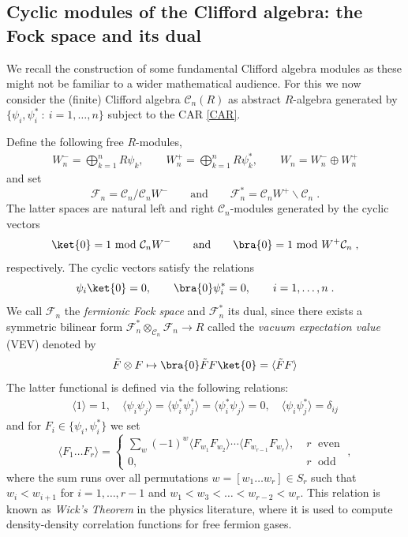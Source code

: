 \documentclass[12pt]{amsart}
\newcommand{\mc}[1]{\mathcal{#1}}
\newcommand{\ring}{R}
\numberwithin{equation}{section}
\numberwithin{figure}{section}
\begin{document}
\subsection{Cyclic modules of the Clifford algebra: the Fock space and its dual}
We recall the construction of some fundamental Clifford algebra modules as these might not be familiar to a wider mathematical audience. For this we now consider the (finite) Clifford algebra $\mc{C}_n(\ring)$ as abstract $\ring$-algebra generated by $\{\psi_i,\psi_i^*~:~i=1,\ldots,n\}$ subject to the CAR \eqref{CAR}.

Define the following free $\ring$-modules,
\begin{gather}
W_n^-=\bigoplus_{k=1}^n\ring \psi_k,\qquad W_n^+=\bigoplus^n_{k=1}\ring\psi^*_k,\qquad
 W_n=W_n^-\oplus W_n^+
\end{gather}
and set
\begin{equation}
    \mc{F}_n=\mc{C}_n/\mc{C}_n W^-\qquad\text{and}\qquad
    \mc{F}^*_n=\mc{C}_nW^+\backslash\mc{C}_n\;.
\end{equation}
The latter spaces are natural left and right $\mc{C}_n$-modules generated by the cyclic vectors
\begin{equation}
\ket{0}=1\!\!\mod \mc{C}_n W^-
\qquad\text{and}\qquad
\bra{0}=1\!\!\mod W^+\mc{C}_n\;,
\end{equation}
respectively. The cyclic vectors satisfy the relations
\[
\psi_i\ket{0}=0,\qquad\bra{0}\psi_i^*=0,\qquad i=1,\ldots,n\;.
\]
We call $\mc{F}_n$ the {\em fermionic Fock space} and $\mc{F}^*_n$ its dual, since there exists a symmetric bilinear form $\mc{F}^*_n\otimes_{\mc{C}_n}\mc{F}_n\to\ring$ called the {\em vacuum expectation value} (VEV) denoted by
\[
\tilde F\otimes F\mapsto \bra{0}\tilde FF\ket{0}=\langle \tilde F F\rangle
\]
The latter functional is defined via the following relations:
\begin{gather}
\langle 1\rangle=1,\quad\langle\psi_i\psi_j\rangle=\langle\psi_i^*\psi^*_j\rangle=\langle\psi^*_i\psi_j\rangle=0,\quad\langle\psi_i\psi^*_j\rangle=\delta_{ij}
\end{gather}
and for $F_i\in\{\psi_i,\psi^*_i\}$ we set
\[
\langle F_1\ldots F_r\rangle=\left\{\begin{array}{ll}
    \sum\limits_{w}(-1)^w\langle F_{w_1}F_{w_2}\rangle\cdots\langle F_{w_{r-1}}F_{w_r}\rangle, &\;r\;\text{ even}  \\
    0, &\;r\;\text{ odd} 
\end{array}
\right.\;,
\]
where the sum runs over all permutations $w=[w_1\ldots w_r]\in S_r$ such that $w_i<w_{i+1}$ for $i=1,\ldots,r-1$ and $w_1<w_3<\ldots <w_{r-2}<w_r$. This relation is known as {\em Wick's Theorem} in the physics literature, where it is used to compute density-density correlation functions for free fermion gases.
\end{document}
